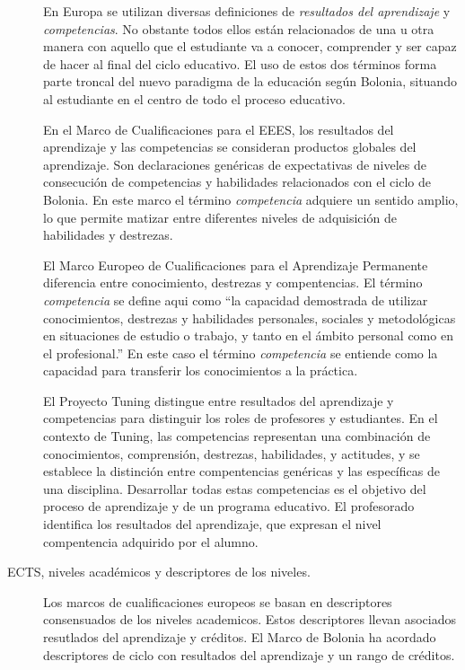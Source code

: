 \begin{description}
			En Europa se utilizan diversas definiciones de \textit{resultados del aprendizaje} y \textit{competencias}. No obstante todos ellos están relacionados de una u otra manera con aquello que el estudiante va a conocer, comprender y ser capaz de hacer al final del ciclo educativo. El uso de estos dos términos forma parte troncal del nuevo paradigma de la educación según Bolonia, situando al estudiante en el centro de todo el proceso educativo.
					
			En el Marco de Cualificaciones para el EEES, los resultados del aprendizaje y las competencias se consideran productos globales del aprendizaje. Son declaraciones genéricas de expectativas de niveles de consecución de competencias y habilidades relacionados con el ciclo de Bolonia. En este marco el término \textit{competencia} adquiere un sentido amplio, lo que permite matizar entre diferentes niveles de adquisición de habilidades y destrezas.
					
			El Marco Europeo de Cualificaciones para el Aprendizaje Permanente diferencia entre conocimiento, destrezas y compentencias. El término \textit{competencia} se define aqui como "`la capacidad demostrada de utilizar conocimientos, destrezas y habilidades personales, sociales y metodológicas en situaciones de estudio o trabajo, y tanto en el ámbito personal como en el profesional."' En este caso el término \textit{competencia} se entiende como la capacidad para transferir los conocimientos a la práctica. 
					
			El Proyecto Tuning distingue entre resultados del aprendizaje y competencias para distinguir los roles de profesores y estudiantes. En el contexto de Tuning, las competencias representan una combinación de conocimientos, comprensión, destrezas, habilidades, y actitudes, y se establece la distinción entre compentencias genéricas y las específicas de una disciplina. Desarrollar todas estas competencias es el objetivo del proceso de aprendizaje y de un programa educativo. El profesorado identifica los resultados del aprendizaje, que expresan el nivel compentencia adquirido por el alumno.

			\item[ECTS, niveles académicos y descriptores de los niveles.]Los marcos de cualificaciones europeos se basan en descriptores consensuados de los niveles academicos. Estos descriptores llevan asociados resutlados del aprendizaje y créditos. El Marco de Bolonia ha acordado descriptores de ciclo con resultados del aprendizaje y un rango de créditos. 
				

\end{description}
